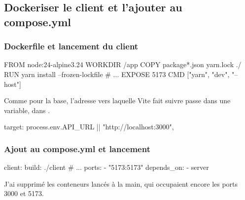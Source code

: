 \subsection{Dockeriser le client et l'ajouter au compose.yml}

\subsubsection{Dockerfile et lancement du client}

\begin{fichier}[docker]
FROM node:24-alpine3.24
WORKDIR /app
COPY package*.json yarn.lock ./
RUN yarn install --frozen-lockfile
# ...
EXPOSE 5173
CMD ["yarn", "dev", "--host"]
\end{fichier}

Comme pour la base, l'adresse vers laquelle Vite fait suivre  passe dans une variable, dans .

\begin{fichier}[typescript]
target: process.env.API_URL || "http://localhost:3000",
\end{fichier}

\begin{commandes}
\end{commandes}



\subsubsection{Ajout au compose.yml et lancement}

\begin{fichier}
  client:
    build: ./client
    # ...
    ports:
      - "5173:5173"
    depends_on:
      - server
\end{fichier}

J'ai supprimé les conteneurs lancés à la main, qui occupaient encore les ports 3000 et 5173.

\begin{commandes}
\end{commandes}

